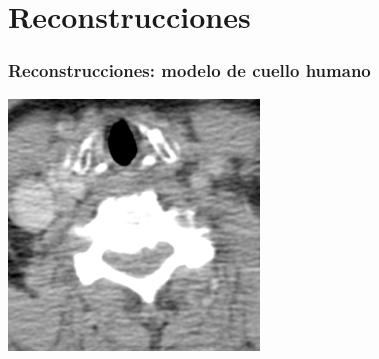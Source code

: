 \section{Reconstrucciones}

\begin{frame}
\frametitle{Reconstrucciones: modelo de cuello humano}

\centering
  \includegraphics[width=0.5\textwidth]{figuras/neck_mri.png}



\end{frame}


